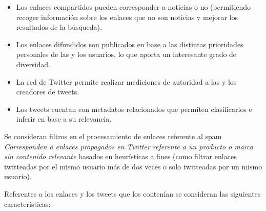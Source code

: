   \begin{itemize}
	\item Los enlaces compartidos pueden corresponder a noticias o no (permitiendo recoger información sobre los enlaces que no son noticias y mejorar los resultados de la búsqueda).
	\item Los enlaces difundidos son publicados en base a las distintas prioridades personales de las y los usuarios, lo que aporta un interesante grado de diversidad.
	\item La red de Twitter permite realizar mediciones de autoridad a las y los creadores de tweets.
	\item Los tweets cuentan con metadatos relacionados que permiten clasificarlos e inferir en base a su relevancia.
  \end{itemize}
  
 Se consideran filtros en el procesamiento de enlaces referente al spam \emph{ Corresponden a enlaces propagados en Twitter referente a un producto o marca sin contenido relevante} basados en heurísticas a fines (como filtrar enlaces twitteadas por el mismo usuario más de dos veces o solo twitteadas por un mismo usuario).
 
 Referentes a los enlaces y los tweets que los contenían se consideran las siguientes características:
  
